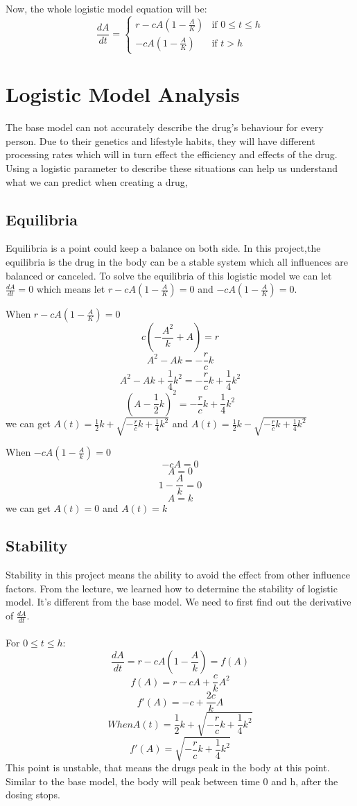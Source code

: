 \documentclass{article}
\begin{document}
Now, the whole logistic model equation will be:
\begin{equation}
  \frac{dA}{dt} =
    \begin{cases}
      r- cA(1-\frac{A}{K}) & \text{if  $0 \leq t \leq h$}\\
      - cA(1-\frac{A}{K}) & \text{if $t > h$}
    \end{cases}       
\end{equation}

\section*{Logistic Model Analysis}

The base model can not accurately describe the drug's behaviour for every person. Due to their genetics and lifestyle habits, they will have different processing rates which will in turn effect the efficiency and effects of the drug. Using a logistic parameter to describe these situations can help us understand what we can predict when creating a drug,


\subsection*{Equilibria}
Equilibria is a point could keep a balance on both side. In this project,the equilibria is the drug in the body can be a stable system which all influences are balanced or canceled. To solve the equilibria of this logistic model we can let $\frac{dA}{dt}=0$ which means let $r-cA(1-\frac{A}{K})=0$ and $-cA(1-\frac{A}{K})=0$.

When $r-cA(1-\frac{A}{K})=0$\\
$$
c(-\frac{A^2}{k}+A)=r
$$
$$
A^2-Ak=-\frac{r}{c}k
$$
$$
A^2-Ak+\frac{1}{4}k^2=-\frac{r}{c}k+\frac{1}{4}k^2
$$
$$
(A-\frac{1}{2}k)^2=-\frac{r}{c}k+\frac{1}{4}k^2
$$
we can get $A(t)=\frac{1}{2}k+\sqrt{-\frac{r}{c}k+\frac{1}{4}k^2}$ and $A(t)=\frac{1}{2}k-\sqrt{-\frac{r}{c}k+\frac{1}{4}k^2}$ 

When $-cA(1-\frac{A}{k})=0$\\
$$
-cA=0
$$
$$
A=0
$$
$$
1-\frac{A}{k}=0
$$
$$
A=k
$$
we can get $A(t) = 0$ and $A(t) = k$ 

\subsection*{Stability}
Stability in this project means the ability to avoid the effect from other influence factors. From the lecture, we learned how to determine the stability of logistic model. It's different from the base model. We need to first find out the derivative of $\frac{dA}{dt}$.\\
\\
For $0 \leq t \leq h$:
$$
\frac{dA}{dt}= r - cA(1-\frac{A}{k}) = f(A)
$$
$$
f(A) = r - cA + \frac{c}{k}A^2
$$
$$
f'(A) = - c + \frac{2c}{k}A
$$
$$
When A(t)=\frac{1}{2}k+\sqrt{-\frac{r}{c}k+\frac{1}{4}k^2}
$$
$$
f'(A) = \sqrt{-\frac{r}{c}k+\frac{1}{4}k^2}
$$
This point is unstable, that means the drugs peak in the body at this point. Similar to the base model, the body will peak between time 0 and h, after the dosing stops. 
\end{document}
